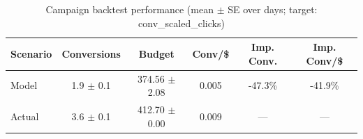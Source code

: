 \begin{table}[htbp]
\centering
\caption{Campaign backtest performance (mean $\pm$ SE over days; target: conv_scaled_clicks)}
\begin{tabular}{lccccc}
\toprule
Scenario & Conversions & Budget & Conv/\$ & Imp. Conv. & Imp. Conv/\$ \\
\midrule
Model & 1.9 $\pm$ 0.1 & 374.56 $\pm$ 2.08 & 0.005 & -47.3\% & -41.9\% \\
Actual & 3.6 $\pm$ 0.1 & 412.70 $\pm$ 0.00 & 0.009 & --- & --- \\
\bottomrule
\end{tabular}

\end{table}
